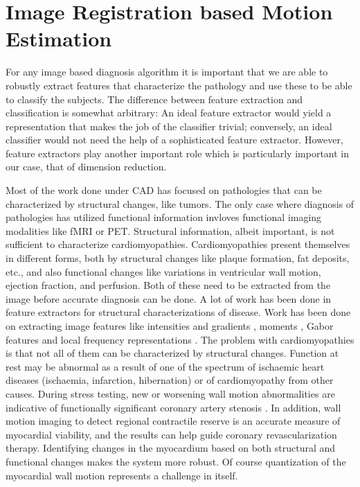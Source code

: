 \chapter{Image Registration based Motion Estimation}
\label{hammer}


For any image based diagnosis algorithm it is important that we are able to robustly extract features that characterize the pathology and use these to be able to classify the subjects. The difference between feature extraction and classification is somewhat arbitrary: An ideal feature extractor would yield a representation that makes the job of the classifier trivial; conversely, an ideal classifier would not need the help of a sophisticated feature extractor. However, feature extractors play another important role which is particularly important in our case, that of dimension reduction. 

Most of the work done under CAD has focused on pathologies that can be characterized by structural changes, like tumors. The only case where diagnosis of pathologies has utilized functional information invloves functional imaging modalities like fMRI or PET. Structural information, albeit important, is not sufficient to characterize cardiomyopathies. Cardiomyopathies present themselves in different forms, both by structural changes like plaque formation, fat deposits, etc., and also functional changes like variations in ventricular wall motion, ejection fraction, and perfusion. Both of these need to be extracted from the image before accurate diagnosis can be done. A lot of work has been done in feature extractors for structural characterizations of disease. Work has been done on extracting image features like intensities and gradients \cite{intgrad}, moments \cite{hammer}\cite{moments}, Gabor features \cite{manju96}\cite{anant} and local frequency representations \cite{locfreq}. The problem with cardiomyopathies is that not all of them can be characterized by structural changes. Function at rest may be abnormal as a result of one of the spectrum of ischaemic heart diseases (ischaemia, infarction, hibernation) or of cardiomyopathy from other causes. During stress testing, new or worsening wall motion abnormalities are indicative of functionally significant coronary artery stenosis \cite{stenoses}. In addition, wall motion imaging to detect regional contractile reserve is an accurate measure of myocardial viability, and the results can help guide coronary revascularization therapy. Identifying changes in the myocardium based on both structural and functional changes makes the system more robust. Of course quantization of the myocardial wall motion represents a challenge in itself.

